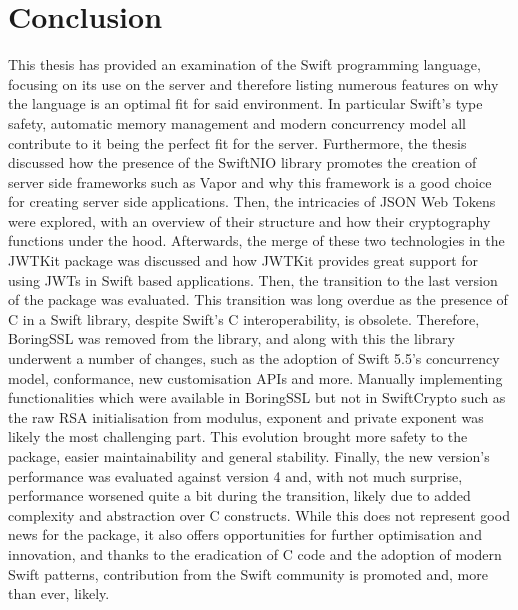 \chapter*{Conclusion}
This thesis has provided an examination of the Swift programming language, focusing on its use on the server and therefore listing numerous features on why the language is an optimal fit for said environment. In particular Swift's type safety, automatic memory management and modern concurrency model all contribute to it being the perfect fit for the server. Furthermore, the thesis discussed how the presence of the SwiftNIO library promotes the creation of server side frameworks such as Vapor and why this framework is a good choice for creating server side applications. Then, the intricacies of JSON Web Tokens were explored, with an overview of their structure and how their cryptography functions under the hood. Afterwards, the merge of these two technologies in the JWTKit package was discussed and how JWTKit provides great support for using JWTs in Swift based applications. Then, the transition to the last version of the package was evaluated. This transition was long overdue as the presence of C in a Swift library, despite Swift's C interoperability, is obsolete. Therefore, BoringSSL was removed from the library, and along with this the library underwent a number of changes, such as the adoption of Swift 5.5's concurrency model,  conformance, new customisation APIs and more. Manually implementing functionalities which were available in BoringSSL but not in SwiftCrypto such as the raw RSA initialisation from modulus, exponent and private exponent was likely the most challenging part. This evolution brought more safety to the package, easier maintainability and general stability. Finally, the new version's performance was evaluated against version 4 and, with not much surprise, performance worsened quite a bit during the transition, likely due to added complexity and abstraction over C constructs. While this does not represent good news for the package, it also offers opportunities for further optimisation and innovation, and thanks to the eradication of C code and the adoption of modern Swift patterns, contribution from the Swift community is promoted and, more than ever, likely.